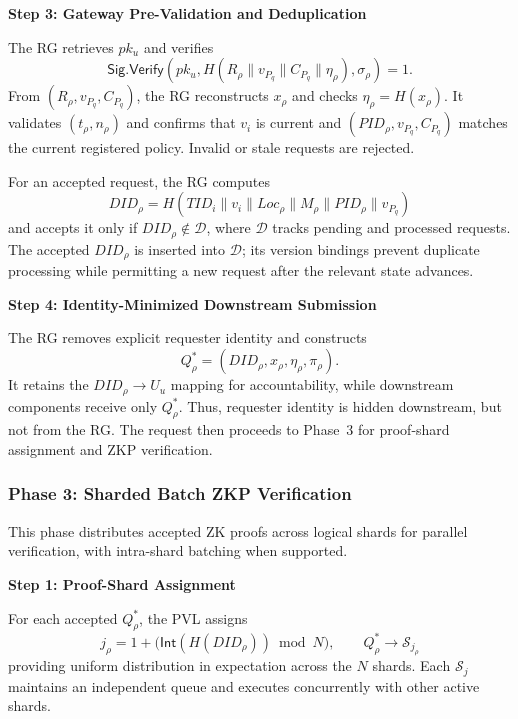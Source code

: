 \documentclass[lettersize,journal]{IEEEtran}
\begin{document}
\noindent\textbf{Step 3: Gateway Pre-Validation and Deduplication}

The RG retrieves $pk_u$ and verifies
\begin{equation}
\mathsf{Sig.Verify}
\left(
pk_u,H(R_\rho\parallel v_{P_q}\parallel C_{P_q}\parallel\eta_\rho),
\sigma_\rho
\right)=1.
\label{eq:signature-verification}
\end{equation}
From $(R_\rho,v_{P_q},C_{P_q})$, the RG reconstructs $x_\rho$ and
checks $\eta_\rho=H(x_\rho)$. It validates $(t_\rho,n_\rho)$ and
confirms that $v_i$ is current and $(PID_\rho,v_{P_q},C_{P_q})$
matches the current registered policy. Invalid or stale requests are
rejected.

For an accepted request, the RG computes
\begin{equation}
DID_\rho=
H(TID_i\parallel v_i\parallel Loc_\rho\parallel M_\rho
\parallel PID_\rho\parallel v_{P_q})
\label{eq:deduplication-id}
\end{equation}
and accepts it only if $DID_\rho\notin\mathcal D$, where $\mathcal D$
tracks pending and processed requests. The accepted $DID_\rho$ is
inserted into $\mathcal D$; its version bindings prevent duplicate
processing while permitting a new request after the relevant state
advances.

\noindent\textbf{Step 4: Identity-Minimized Downstream Submission}

The RG removes explicit requester identity and constructs
\begin{equation}
Q_\rho^{*}=(DID_\rho,x_\rho,\eta_\rho,\pi_\rho).
\label{eq:identity-minimized-query}
\end{equation}
It retains the $DID_\rho\!\rightarrow\!U_u$ mapping for accountability,
while downstream components receive only $Q_\rho^{*}$. Thus, requester
identity is hidden downstream, but not from the RG. The request then
proceeds to Phase~3 for proof-shard assignment and ZKP verification.
\smallskip

\subsubsection*{\textbf{Phase 3: Sharded Batch ZKP Verification}}
\label{sec:phase3}

This phase distributes accepted ZK proofs across logical shards for parallel verification, with intra-shard batching when supported.

\noindent\textbf{Step 1: Proof-Shard Assignment}

For each accepted $Q_\rho^{*}$, the PVL assigns
\begin{equation}
j_\rho=
1+\big(\mathsf{Int}(H(DID_\rho))\bmod N\big),
\qquad
Q_\rho^{*}\rightarrow\mathcal{S}_{j_\rho}
\label{eq:phase3-shard}
\end{equation}
providing uniform distribution in expectation across the $N$ shards. Each $\mathcal{S}_j$ maintains an independent queue and executes concurrently with other active shards.
\end{document}

